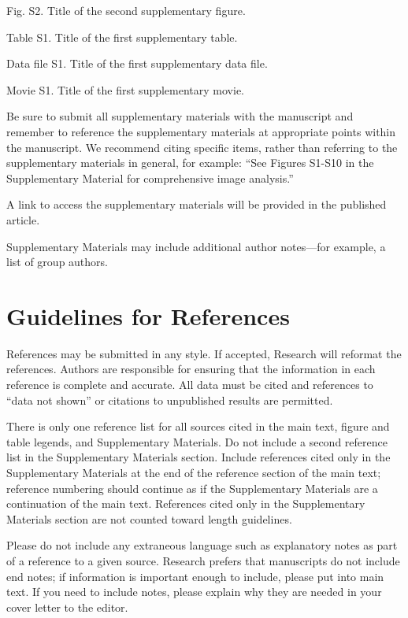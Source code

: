 \documentclass{article}
\begin{document}
Fig. S2. Title of the second supplementary figure.

Table S1. Title of the first supplementary table.

Data file S1. Title of the first supplementary data file.

Movie S1. Title of the first supplementary movie.

\medskip
Be sure to submit all supplementary materials with the manuscript and remember to reference the supplementary materials at appropriate points within the manuscript. We recommend citing specific items, rather than referring to the supplementary materials in general, for example: ``See Figures S1-S10 in the Supplementary Material for comprehensive image analysis.''

A link to access the supplementary materials will be provided in the published article.

Supplementary Materials may include additional author notes—for example, a list of group authors.

\section*{Guidelines for References}
References may be submitted in any style. If accepted, Research will reformat the references. Authors are responsible for ensuring that the information in each reference is complete and accurate. All data must be cited and references to “data not shown” or citations to unpublished results are permitted.

There is only one reference list for all sources cited in the main text, figure and table legends, and Supplementary Materials. Do not include a second reference list in the Supplementary Materials section. Include references cited only in the Supplementary Materials at the end of the reference section of the main text; reference numbering should continue as if the Supplementary Materials are a continuation of the main text. References cited only in the Supplementary Materials section are not counted toward length guidelines.

Please do not include any extraneous language such as explanatory notes as part of a reference to a given source. Research prefers that manuscripts do not include end notes; if information is important enough to include, please put into main text.  If you need to include notes, please explain why they are needed in your cover letter to the editor.

\printbibliography
\end{document}
